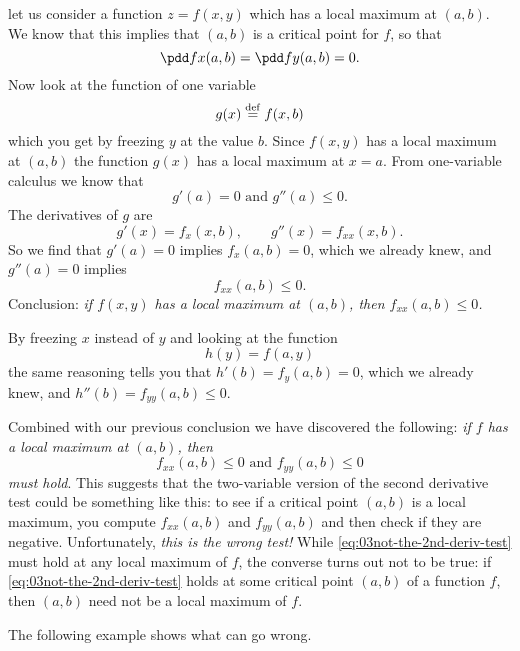let us consider a function $z=f(x, y)$ which has a local maximum at
$(a,b)$.  We know that this implies that $(a,b)$ is a critical point
for $f$, so that
\[
\pdd fx(a,b) = \pdd fy(a,b) = 0.
\]
Now look at the function of one variable
\[
g(x) \stackrel{\rm def}= f(x, b)
\]
which you get by freezing $y$ at the value $b$.  Since $f(x,y)$ has a
local maximum at $(a, b)$ the function $g(x)$ has a local maximum at
$x=a$.  From one-variable calculus we know that 
\[
g'(a) =0 \text{ and } g''(a)\leq 0.
\]
The derivatives of $g$ are
\[
g'(x) = f_x(x, b), \qquad g''(x) = f_{xx}(x, b).
\]
So we find that $g'(a) = 0$ implies $f_x(a, b) = 0$, which we already
knew, and $g''(a)=0$ implies
\begin{equation}
  f_{xx}(a, b) \leq 0.
  \label{eq:03fxx-nonpositive}
\end{equation}
Conclusion: \emph{if $f(x, y)$ has a local maximum at $(a, b)$, then
$f_{xx}(a,b) \le 0$.}

By freezing $x$ instead of $y$ and looking at the function 
\[
h(y) = f(a, y)
\]
the same reasoning tells you that $h'(b) = f_y(a, b)=0$, which we already
knew, and $h''(b) = f_{yy}(a, b)\leq 0$.

Combined with our previous conclusion we have discovered the
following: \emph{if $f$ has a local maximum at $(a, b)$, then}
\begin{equation}\label{eq:03not-the-2nd-deriv-test}
  f_{xx}(a, b) \leq 0 \text{ and } f_{yy}(a, b) \leq 0
\end{equation}
\emph{must hold}.  This suggests that the two-variable version of the
second derivative test could be something like this: to see if a
critical point $(a,b)$ is a local maximum, you compute $f_{xx}(a, b)$
and $f_{yy}(a, b)$ and then check if they are negative.
Unfortunately, \emph{this is the wrong test!} While
\eqref{eq:03not-the-2nd-deriv-test} must hold at any local maximum of
$f$, the converse turns out not to be true: if
\eqref{eq:03not-the-2nd-deriv-test} holds at some critical point $(a,
b)$ of a function $f$, then $(a, b)$ need not be a local maximum of
$f$.

The following example shows what can go wrong.


